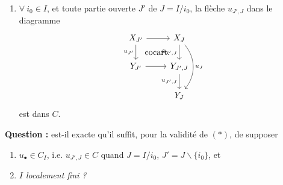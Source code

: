 \begin{enumerate}
\item[$(*)$] $\forall\ i_0 \in I$, et toute partie ouverte $J'$ de $J = I/i_0$, la flèche $u_{J',J}$ dans le diagramme
\[
\begin{tikzcd}
X_{J'} \arrow[r] \arrow[d, "u_{J'}"'] \arrow[dr, phantom, "\cocart"] & X_J \arrow[d, "\tilde{u}_{J',J}"'] \arrow[dd, bend left=40, "u_J"] \\
Y_{J'} \arrow[r] & Y_{J',J} \arrow[d, "u_{J',J}"'] \\
 & Y_J
\end{tikzcd}
\]
est dans $C$.
\end{enumerate}

\textbf{Question :} est-il exacte qu'il suffit, pour la validité de $(*)$, de supposer %
\begin{enumerate}
\item[a)] $u_\bullet \in C_I$, i.e. $u_{J',J} \in C$ quand $J = I/i_0$, $J' = J \backslash \{i_0\}$, et
\item[b)] \textit{$I$ localement fini ?}
\end{enumerate}



